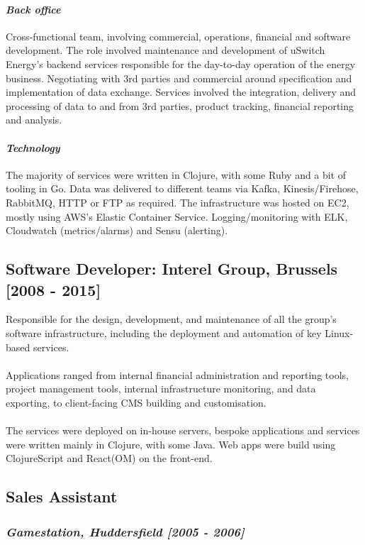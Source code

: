 \documentclass{article}
\begin{document}
\paragraph*{\emph{Back office}}

Cross-functional team, involving commercial, operations, financial and software
development. The role involved maintenance and development of uSwitch Energy's
backend services responsible for the day-to-day operation of the energy
business. Negotiating with 3rd parties and commercial around specification and
implementation of data exchange. Services involved the integration, delivery and
processing of data to and from 3rd parties, product tracking, financial
reporting and analysis.
\paragraph*{\emph{Technology}}

The majority of services were written in Clojure, with some Ruby and a bit of
tooling in Go. Data was delivered to different teams via Kafka,
Kinesis/Firehose, RabbitMQ, HTTP or FTP as required. The infrastructure was
hosted on EC2, mostly using AWS's Elastic Container Service. Logging/monitoring
with ELK, Cloudwatch (metrics/alarms) and Sensu (alerting).
\subsection*{Software Developer: Interel Group, Brussels [2008 - 2015]}

Responsible for the design, development, and maintenance of all the group's
software infrastructure, including the deployment and automation of key
Linux-based services.\\
\\
Applications ranged from internal financial administration and reporting tools,
project management tools, internal infrastructure monitoring, and data
exporting, to client-facing CMS building and customisation.\\
\\
The services were deployed on in-house servers, bespoke applications and
services were written mainly in Clojure, with some Java. Web apps were build
using ClojureScript and React(OM) on the front-end.
\subsection*{Sales Assistant}
\subsubsection*{\emph{Gamestation, Huddersfield [2005 - 2006]}}
\end{document}
